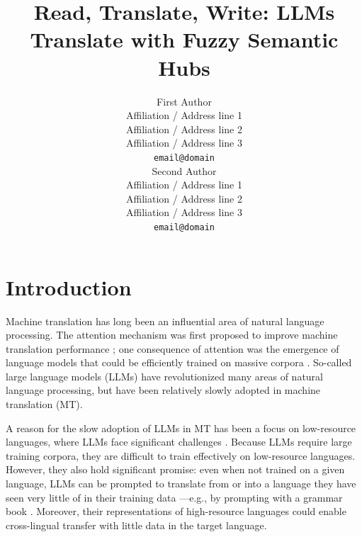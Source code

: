 \documentclass[11pt]{article}
\title{Read, Translate, Write: LLMs Translate with Fuzzy Semantic Hubs}
\author{First Author \\
  Affiliation / Address line 1 \\
  Affiliation / Address line 2 \\
  Affiliation / Address line 3 \\
  \texttt{email@domain} \\\And
  Second Author \\
  Affiliation / Address line 1 \\
  Affiliation / Address line 2 \\
  Affiliation / Address line 3 \\
  \texttt{email@domain} \\}
\begin{document}
\maketitle
\begin{abstract}

\end{abstract}

\section{Introduction}

Machine translation has long been an influential area of natural language processing. The attention mechanism was first proposed to improve machine translation performance \citep{bahdanau2015neuralmachinetranslationjointly,luong-etal-2015-effective,vaswani2017attention}; one consequence of attention was the emergence of language models that could be efficiently trained on massive corpora \citep{devlin-etal-2019-bert,radford2018improving}. So-called large language models (LLMs) have revolutionized many areas of natural language processing, but have been relatively slowly adopted in machine translation (MT).

A reason for the slow adoption of LLMs in MT has been a focus on low-resource languages, where LLMs face significant challenges \citep{hendy2023goodgptmodelsmachine,robinson2023chatgptmtcompetitivehigh}. Because LLMs require large training corpora, they are difficult to train effectively on low-resource languages. However, they also hold significant promise: even when not trained on a given language, LLMs can be prompted to translate from or into a language they have seen very little of in their training data \citep{cahyawijaya-etal-2024-llms}---e.g., by prompting with a grammar book \citep{tanzer2024a}. Moreover, their representations of high-resource languages could enable cross-lingual transfer \citep{conneau-etal-2020-unsupervised} with little data in the target language.
\end{document}
